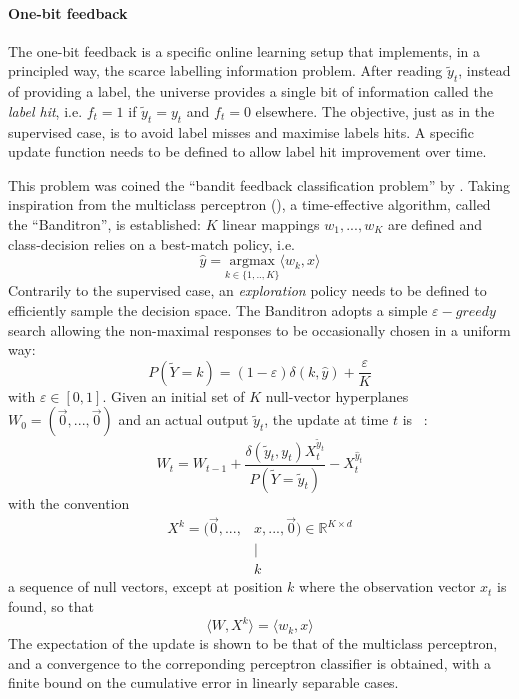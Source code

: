 \documentclass[preprint,12pt,authoryear]{elsarticle}
\begin{document}
\paragraph{One-bit feedback}
The one-bit feedback is a specific online learning setup that implements, in a principled way, the scarce labelling information problem. After reading $\tilde{y}_t$, instead of providing a label, the universe provides a single bit of information called the \textit{label hit}, i.e. $f_t = 1$ if  $\tilde{y}_t=y_t$ and $f_t = 0$ elsewhere. The objective, just as in the supervised case, is to avoid label misses and maximise labels hits. A specific update function needs to be defined to allow label hit improvement over time. 

This problem was coined the ``bandit feedback classification problem'' by \cite{kakade2008efficient}. Taking inspiration from the multiclass perceptron (\cite{duda1973pattern}), a time-effective algorithm, called the ``Banditron'', is established:
$K$ linear mappings $w_1, ..., w_K$ are defined and class-decision relies on a best-match policy, i.e.
\begin{equation}\label{eq:argmax}
\hat{y} = \underset{k \in\{1,..,K\}}{\text{argmax}}  \langle w_k, x \rangle
\end{equation}
Contrarily to the supervised case, an \textit{exploration} policy needs to be defined to efficiently sample the decision space. The Banditron adopts a simple  $\varepsilon-greedy$ search allowing the non-maximal responses to be occasionally chosen in a uniform way:
\begin{equation}\label{eq:eps-greedy}
P(\tilde{Y}=k) = (1-\varepsilon) \delta(k,\hat{y}) + \frac{\varepsilon}{K}
\end{equation}
 with $\varepsilon \in [0,1]$.
Given an initial set of $K$ null-vector hyperplanes $W_0 = (\vec{0}, ..., \vec{0})$ and an actual output $\tilde{y}_t$, the update at time $t$ is ~:
\begin{equation} \label{eq:banditron-update}
W_t = W_{t-1} + \frac{\delta(\tilde{y}_t ,y_t) X_t^{\tilde{y}_t}}{P(\tilde{Y}=\tilde{y}_t)} - X_t^{\hat{y}_t}
\end{equation}   
with the convention 
\begin{align}\label{eq:X}
X^k = (\vec{0}, ..., & x, ..., \vec{0}) \in \mathbb{R}^{K \times d}\\
&\mid\nonumber\\
&k\nonumber
\end{align}
 a sequence of null vectors, except at position $k$ where the observation vector $x_t$ is found, so that 
 \begin{equation}\label{eq:simil-dot-product}
 \langle W, X^k\rangle = \langle w_k, x\rangle
 \end{equation}
The expectation of the update is shown to be that of the multiclass perceptron, and a convergence to the correponding perceptron classifier is obtained, with a finite bound on the cumulative error in linearly separable cases. 
\end{document}
